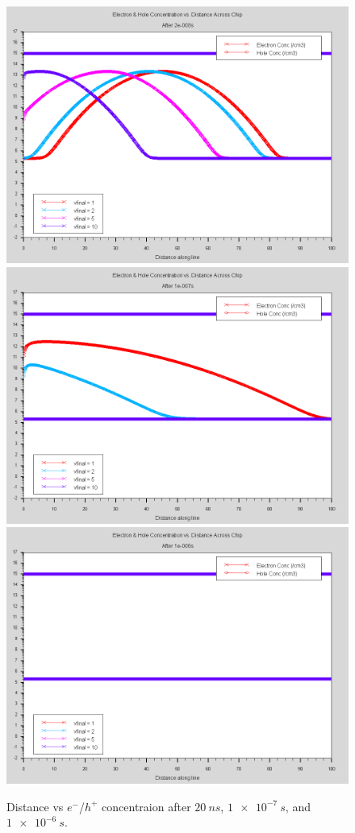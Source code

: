 \documentclass[12pt]{article}
\begin{document}
\begin{figure}[htp]
  \centering
  \includegraphics[width=.3\textwidth]{voltage_after2e-008s}\hfill
  \includegraphics[width=.3\textwidth]{voltage_after1e-007s}\hfill
  \includegraphics[width=.3\textwidth]{voltage_after1e-006s}
  \caption{Distance vs $e^-$/$h^+$ concentraion after $\SI{20}{ns}$, $\SI{1e-7}{s}$, and $\SI{1e-6}{s}$.}
  \label{fig:distancevcurrent_voltage}
\end{figure}



\end{document}
